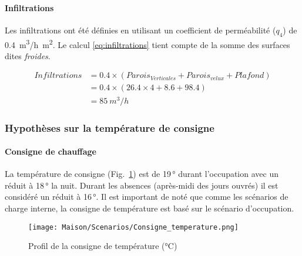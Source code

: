\paragraph{Infiltrations} %
\label{par:infiltrations}
Les infiltrations ont été définies en utilisant un coefficient de perméabilité ($q_{4}$) de 0.4~\si{m^{3}/h.m^{2}}.
Le calcul \eqref{eq:infiltrations} tient compte de la somme des surfaces dites \emph{froides}.

\begin{align}
    Infiltrations &= 0.4 \times (Parois_{Verticales} + Parois_{velux} + Plafond)\\
    &              = 0.4 \times (26.4 \times 4 + 8.6 + 98.4)\\
    &              = 85~\si{m^{3}/h}
    \label{eq:infiltrations}
\end{align}

\subsubsection{Hypothèses sur la température de consigne} %
\label{ssub:hypothèses_sur_la_température_de_consigne}

\paragraph{Consigne de chauffage} %
\label{par:consigne_de_chauffage}
La température de consigne (Fig.~\ref{fig:consigne_scenario}) est de 19\,\si{\degree} durant l’occupation avec un
réduit à 18\,\si{\degree} la nuit. Durant les absences (après-midi des jours ouvrés)
il est considéré un réduit à 16\,\si{\degree}. Il est important de noté que comme
les scénarios de charge interne, la consigne de température est basé sur le scénario
d’occupation.
\begin{figure}
    \begin{center}
        \texttt{[image: Maison/Scenarios/Consigne\_temperature.png]}
    \end{center}
    \caption{Profil de la consigne de température (\si{\celsius})}
    \label{fig:consigne_scenario}
\end{figure}


